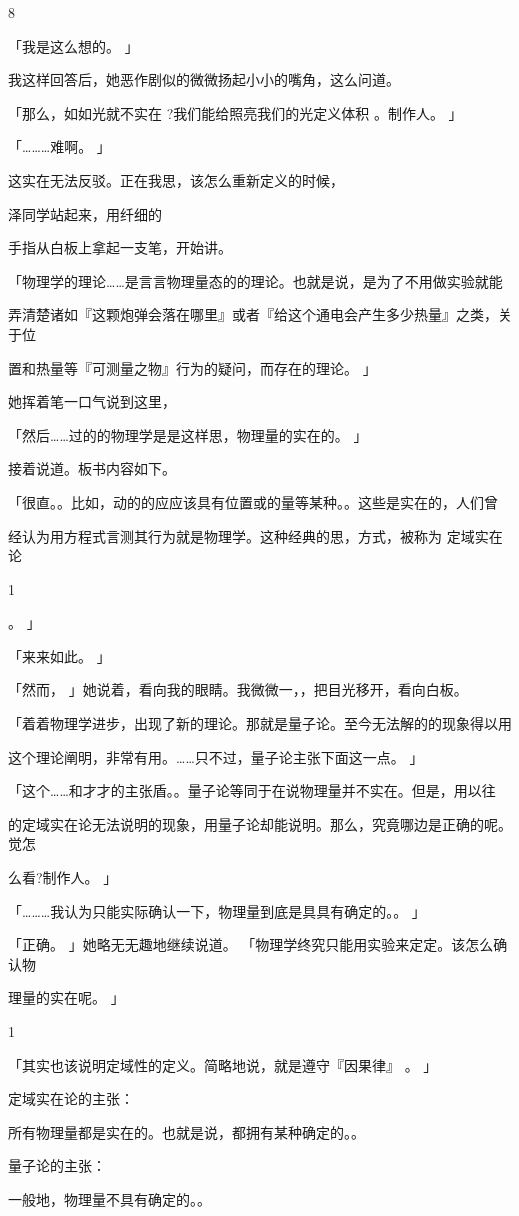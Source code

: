 8\par
「我是这么想的。 」\par
我这样回答后，她恶作剧似的微微扬起小小的嘴角，这么问道。\par
「那么，如如光就不实在 ?我们能给照亮我们的光定义体积 。制作人。 」\par
「………难啊。 」\par
这实在无法反驳。正在我思，该怎么重新定义的时候，\par
泽同学站起来，用纤细的\par
手指从白板上拿起一支笔，开始讲。\par
「物理学的理论……是言言物理量态的的理论。也就是说，是为了不用做实验就能\par
弄清楚诸如『这颗炮弹会落在哪里』或者『给这个通电会产生多少热量』之类，关于位\par
置和热量等『可测量之物』行为的疑问，而存在的理论。 」\par
她挥着笔一口气说到这里，\par
「然后……过的的物理学是是这样思，物理量的实在的。 」\par
接着说道。板书内容如下。\par
「很直。。比如，动的的应应该具有位置或的量等某种。。这些是实在的，人们曾\par
经认为用方程式言测其行为就是物理学。这种经典的思，方式，被称为 定域实在论\par
1\par
。 」\par
「来来如此。 」\par
「然而， 」她说着，看向我的眼睛。我微微一，，把目光移开，看向白板。\par
「着着物理学进步，出现了新的理论。那就是量子论。至今无法解的的现象得以用\par
这个理论阐明，非常有用。……只不过，量子论主张下面这一点。 」\par
「这个……和才才的主张盾。。量子论等同于在说物理量并不实在。但是，用以往\par
的定域实在论无法说明的现象，用量子论却能说明。那么，究竟哪边是正确的呢。觉怎\par
么看?制作人。 」\par
「………我认为只能实际确认一下，物理量到底是具具有确定的。。 」\par
「正确。 」她略无无趣地继续说道。 「物理学终究只能用实验来定定。该怎么确认物\par
理量的实在呢。 」\par
1\par
「其实也该说明定域性的定义。简略地说，就是遵守『因果律』 。 」\par
定域实在论的主张：\par
所有物理量都是实在的。也就是说，都拥有某种确定的。。\par
量子论的主张：\par
一般地，物理量不具有确定的。。\par

